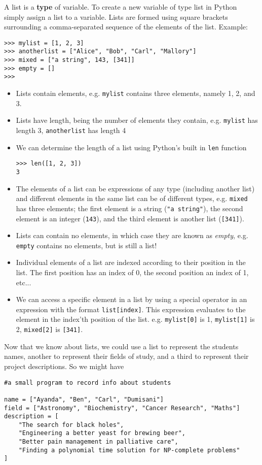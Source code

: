 A list is a \textbf{type} of variable. To create a new   variable of type list in Python simply assign a list to a variable.   Lists are formed using square brackets surrounding a comma-separated   sequence of the elements of the list.  Example:
\begin{lstlisting}
>>> mylist = [1, 2, 3]
>>> anotherlist = ["Alice", "Bob", "Carl", "Mallory"]
>>> mixed = ["a string", 143, [341]]
>>> empty = []
>>>
\end{lstlisting}
\begin{itemize}
	\item Lists contain elements, e.g. \texttt{mylist} contains three elements,    namely 1, 2, and 3.
	\item Lists have length, being the number of elements they contain,    e.g. \texttt{mylist} has length 3, \texttt{anotherlist} has length 4
	\item We can determine the length of a list using Python's built in    \texttt{len}    function
\begin{lstlisting}
>>> len([1, 2, 3])
3
\end{lstlisting}
	\item The elements of a list can be expressions of any type    (including another list) and different elements in the same list    can be of different types, e.g. \texttt{mixed} has three elements; the    first element is a string (\texttt{"a string"}), the second element is an    integer (\texttt{143}), and the third element is another list (\texttt{[341]}).
	\item Lists can contain no elements, in which case they are known as    \textit{empty}, e.g. \texttt{empty} contains no elements, but is still a list!
	\item Individual elements of a list are indexed according to their    position in the list. The first position has an index of 0, the    second position an index of 1, etc...
	\item We can access a specific element in a list by using a special    operator in an expression with the format    
\texttt{list[index]}. This expression evaluates to the element    in the index'th position of the list. e.g. 
\texttt{mylist[0]}    is 1, 
\texttt{mylist[1]} is 2, 
\texttt{mixed[2]} is    \texttt{[341]}.
\end{itemize}

Now that we know about lists, we could use a list to represent the   students names, another to represent their fields of study, and a third   to represent their project descriptions. So we might have
\begin{lstlisting}
#a small program to record info about students

name = ["Ayanda", "Ben", "Carl", "Dumisani"]
field = ["Astronomy", "Biochemistry", "Cancer Research", "Maths"]
description = [
    "The search for black holes",
    "Engineering a better yeast for brewing beer",
    "Better pain management in palliative care",
    "Finding a polynomial time solution for NP-complete problems"
]
\end{lstlisting}

